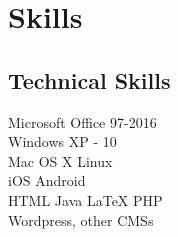 \documentclass[]{deedy-resume-openfont}
\begin{document}
\begin{minipage}[t]{0.33\textwidth}
\sectionsep


\section{Skills}
\subsection{Technical Skills}
\textbullet Microsoft Office 97-2016\\
\textbullet Windows XP - 10\\
\textbullet Mac OS X
\textbullet Linux \\
\textbullet iOS
\textbullet Android  \\
\textbullet HTML
\textbullet Java
\textbullet \LaTeX
\textbullet PHP \\
\textbullet Wordpress, other CMSs  \\

\sectionsep

%
%

\end{minipage} 
\hfill
\end{document}
